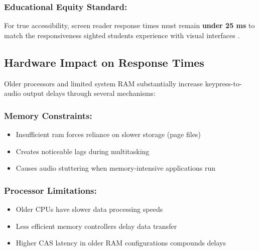 \subsubsection{Educational Equity Standard:}

For true accessibility, screen reader response times must remain \textbf{under 25 ms} to match the responsiveness sighted students experience with visual interfaces \supercite{W3C2018WCAG21}.

\subsection{Hardware Impact on Response Times}\label{hardware-impact-on-response-times}

Older processors and limited system RAM substantially increase keypress-to-audio output delays through several mechanisms:

\subsubsection{Memory Constraints:}

\begin{itemize}
	\item Insufficient \gls{ram} forces reliance on slower storage (page files) \supercite{Microsoft2023WindowsPerformance}
	\item Creates noticeable lags during multitasking \supercite{Intel2024ProcessorMemory}
	\item Causes \gls{audio} stuttering when memory-intensive applications run \supercite{Realtek2023AudioDriverPerformance}
\end{itemize}


\subsubsection{Processor Limitations:}

\begin{itemize}
	\item Older CPUs have slower data processing speeds \supercite{AMD2024RyzenPerformance}
	\item Less efficient memory controllers delay data transfer \supercite{AnandTech2023MemoryControllers}
	\item Higher CAS latency in older RAM configurations compounds delays \supercite{TechSpot2023RAMTimings}
\end{itemize}


